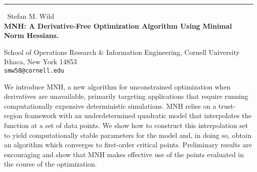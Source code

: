 \documentclass{report}
\begin{document}
\begin{center}
\rule{6in}{1pt} \
{\large Stefan M. Wild
 \\
{\bf MNH: A Derivative-Free Optimization Algorithm Using Minimal Norm Hessians.}}

School of Operations Research & Information Engineering, Cornell
University \\ Ithaca, New York 14853
\\
{\tt smw58@cornell.edu}
\end{center}

We introduce MNH, a new algorithm for unconstrained optimization when
derivatives are unavailable, primarily targeting applications that require
running computationally expensive deterministic simulations. MNH relies on
a trust-region framework with an underdetermined quadratic model that
interpolates the function at a set of data points.  We show how to
construct this interpolation set to yield computationally stable
parameters for the  model and, in doing so, obtain an algorithm which
converges to first-order critical points. Preliminary results are
encouraging and show that MNH makes effective use of the points evaluated
in the course of the optimization.
\end{document}
